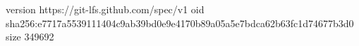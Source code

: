 version https://git-lfs.github.com/spec/v1
oid sha256:e7717a5539111404c9ab39bd0e9e4170b89a05a5e7bdca62b63fc1d74677b3d0
size 349692
